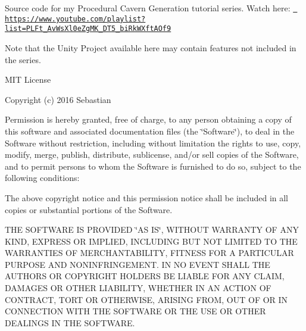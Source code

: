 Source code for my Procedural Cavern Generation tutorial series. Watch here\+: \href{https://www.youtube.com/playlist?list=PLFt_AvWsXl0eZgMK_DT5_biRkWXftAOf9}{\texttt{ https\+://www.\+youtube.\+com/playlist?list=\+PLFt\+\_\+\+Av\+Ws\+Xl0e\+Zg\+MK\+\_\+\+DT5\+\_\+bi\+Rk\+WXft\+AOf9}}

Note that the Unity Project available here may contain features not included in the series.

MIT License

Copyright (c) 2016 Sebastian

Permission is hereby granted, free of charge, to any person obtaining a copy of this software and associated documentation files (the \char`\"{}\+Software\char`\"{}), to deal in the Software without restriction, including without limitation the rights to use, copy, modify, merge, publish, distribute, sublicense, and/or sell copies of the Software, and to permit persons to whom the Software is furnished to do so, subject to the following conditions\+:

The above copyright notice and this permission notice shall be included in all copies or substantial portions of the Software.

THE SOFTWARE IS PROVIDED \char`\"{}\+AS IS\char`\"{}, WITHOUT WARRANTY OF ANY KIND, EXPRESS OR IMPLIED, INCLUDING BUT NOT LIMITED TO THE WARRANTIES OF MERCHANTABILITY, FITNESS FOR A PARTICULAR PURPOSE AND NONINFRINGEMENT. IN NO EVENT SHALL THE AUTHORS OR COPYRIGHT HOLDERS BE LIABLE FOR ANY CLAIM, DAMAGES OR OTHER LIABILITY, WHETHER IN AN ACTION OF CONTRACT, TORT OR OTHERWISE, ARISING FROM, OUT OF OR IN CONNECTION WITH THE SOFTWARE OR THE USE OR OTHER DEALINGS IN THE SOFTWARE. 